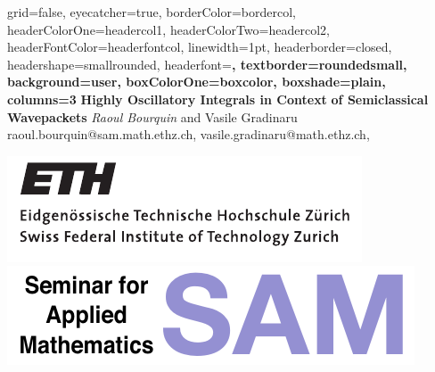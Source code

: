 \documentclass[b0paper,portrait,fontscale=0.24]{baposter}
\begin{document}
\begin{poster}{
    grid=false,
    eyecatcher=true,
    borderColor=bordercol,
    headerColorOne=headercol1,
    headerColorTwo=headercol2,
    headerFontColor=headerfontcol,
    linewidth=1pt,
    headerborder=closed,
    headershape=smallrounded,
    headerfont=\Large\sf\bf,
    textborder=roundedsmall,
    background=user,
    boxColorOne=boxcolor,
    boxshade=plain,
    columns=3
  }
  {
  }
  {
    {\sf\bf
      Highly Oscillatory Integrals in Context}
    \vspace{4pt}
    {\sf\bf
      of Semiclassical Wavepackets
    }
  }
  {
    \vspace{2pt}
    \textit{Raoul Bourquin} and Vasile Gradinaru\\
    {\small raoul.bourquin@sam.math.ethz.ch,
      vasile.gradinaru@math.ethz.ch,
    }
  }
  {
    \begin{minipage}{14em}
      \includegraphics[scale=0.65]{ETH_Logo} \\
      \includegraphics[scale=0.5]{SAM_Logo}
    \end{minipage}
  }



\end{poster}
\end{document}
